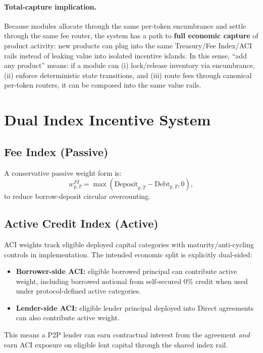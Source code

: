 \documentclass[version=preprint]{iacrcc}
\begin{document}
\paragraph{Total-capture implication.}
Because modules allocate through the same per-token encumbrance and settle through the same fee router, the system has a path to \textbf{full economic capture} of product activity: new products can plug into the same Treasury/Fee Index/ACI rails instead of leaking value into isolated incentive islands. In this sense, ``add any product'' means: if a module can (i) lock/release inventory via encumbrance, (ii) enforce deterministic state transitions, and (iii) route fees through canonical per-token routers, it can be composed into the same value rails.

\section{Dual Index Incentive System}

\subsection{Fee Index (Passive)}

A conservative passive weight form is:
\[
w^{FI}_{p,T} = \max(\text{Deposit}_{p,T} - \text{Debt}_{p,T}, 0),
\]
to reduce borrow-deposit circular overcounting.

\subsection{Active Credit Index (Active)}

ACI weights track eligible deployed capital categories with maturity/anti-cycling controls in implementation. The intended economic split is explicitly dual-sided:
\begin{itemize}
  \item \textbf{Borrower-side ACI:} eligible borrowed principal can contribute active weight, including borrowed notional from self-secured 0\% credit when used under protocol-defined active categories.
  \item \textbf{Lender-side ACI:} eligible lender principal deployed into Direct agreements can also contribute active weight.
\end{itemize}

This means a P2P lender can earn contractual interest from the agreement \emph{and} earn ACI exposure on eligible lent capital through the shared index rail.
\end{document}
